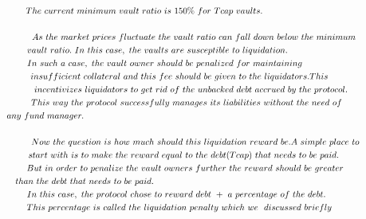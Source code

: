 {\begin{gather}
 \notag\\
The\ current\ minimum\ vault\ ratio\ is\ 150\%\ for\ Tcap\ vaults.\ \ \ \ \ \ \ \ \ \ \ \ \ \ \ \ \ \ \ \ \ \ \ \ \ \ \ \ \ \ \ \ \ \ \  \notag\\
 \notag\\
As\ the\ market\ prices\ fluctuate\ the\ vault\ ratio\ can\ fall\ down\ below\ the\ minimum\  \notag\\
\ vault\ ratio.\ In\ this\ case,\ the\ vaults\ are\ susceptible\ to\ liquidation.\ \ \ \ \ \ \ \ \ \ \ \ \ \ \ \ \ \ \ \ \ \ \ \ \ \ \  \notag\\
In\ such\ a\ case,\ the\ vault\ owner\ should\ be\ penalized\ for\ maintaining\ \ \ \ \ \ \ \ \ \ \ \ \ \ \ \ \ \ \ \ \  \notag\\
insufficient\ collateral\ and\ this\ fee\ should\ be\ given\ to\ the\ liquidators.This\ \ \ \ \ \ \ \ \ \ \  \notag\\
incentivizes\ liquidators\ to\ get\ rid\ of\ the\ unbacked\ debt\ accrued\ by\ the\ protocol.\ \ \  \notag\\
This\ way\ the\ protocol\ successfully\ manages\ its\ liabilities\ without\ the\ need\ of\ \ \ \ \ \  \notag\\
\ \ \ \ any\ fund\ manager.\ \ \ \ \ \ \ \ \ \ \ \ \ \ \ \ \ \ \ \ \ \ \ \ \ \ \ \ \ \ \ \ \ \ \ \ \ \ \ \ \ \ \ \ \ \ \ \ \ \ \ \ \ \ \ \ \ \ \ \ \ \ \ \ \ \ \ \ \ \ \ \ \ \ \ \ \ \ \ \ \ \ \ \ \ \ \ \ \ \ \ \ \ \ \ \ \ \ \ \ \ \ \ \ \ \ \  \notag\\
 \notag\\
Now\ the\ question\ is\ how\ much\ should\ this\ liquidation\ reward\ be.A\ simple\ place\ to \notag\\
start\ with\ is\ to\ make\ the\ reward\ equal\ to\ the\ debt( Tcap) \ that\ needs\ to\ be\ paid.\ \ \ \ \ \ \ \  \notag\\
But\ in\ order\ to\ penalize\ the\ vault\ owners\ further\ the\ reward\ should\ be\ greater\ \ \ \ \ \ \  \notag\\
than\ the\ debt\ that\ needs\ to\ be\ paid.\ \ \ \ \ \ \ \ \ \ \ \ \ \ \ \ \ \ \ \ \ \ \ \ \ \ \ \ \ \ \ \ \ \ \ \ \ \ \ \ \ \ \ \ \ \ \ \ \ \ \ \ \ \ \ \ \ \ \ \ \ \ \ \ \ \ \ \ \ \ \ \ \ \ \ \  \notag\\
\ \ In\ this\ case,\ the\ protocol\ chose\ to\ reward\ debt\ +\ a\ percentage\ of\ the\ debt.\ \ \ \ \ \ \ \ \ \ \ \ \ \ \  \notag\\
This\ percentage\ is\ called\ the\ liquidation\ penalty\ which\ we\ \ discussed\ briefly\ \ \ \ \ \ \ \ \ \ \  \notag\\

\end{gather}}

